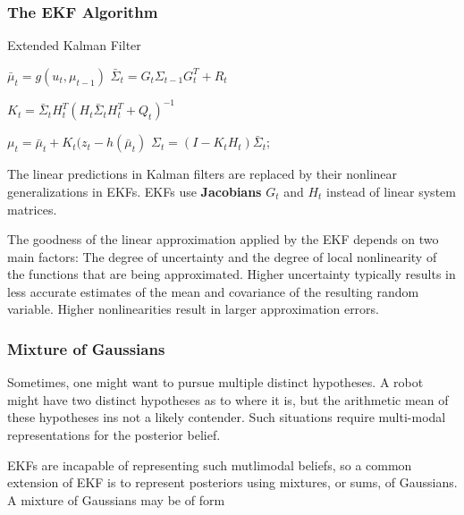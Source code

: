 \documentclass[14pt,letterpaper]{article}
\theoremstyle{definition}
\newcommand{\obs}{\bm{z}}
\newcommand{\control}{\bm{u}}
\begin{document}
\subsubsection{The EKF Algorithm}

\begin{algorithm}[H]
\caption{Extended Kalman Filter}
\KwInput{$\mu_{t-1}$, $\Sigma_{t-1}$, control $\control_t$, measurement $\obs_t$}

\BlankLine
{}
$\bar{\mu}_t = g(u_t, \mu_{t-1})$\;
$\bar{\Sigma}_t = G_t \Sigma_{t-1} G_t^T + R_t$\;

\BlankLine
{}
$K_t = \bar{\Sigma}_t H_t^T (H_t \bar{\Sigma}_t H_t^T + Q_t)^{-1}$\;

\BlankLine
{}
$\mu_t = \bar{\mu}_t + K_t (z_t -  h(\bar{\mu}_t)$\;
$\Sigma_t = (I - K_t H_t)\bar{\Sigma}_t$;\

\BlankLine
{}
\end{algorithm}

\vspace{2mm}

The linear predictions in Kalman filters are replaced by their nonlinear generalizations in EKFs.
EKFs use \textbf{Jacobians} $G_t$ and $H_t$ instead of linear system matrices.

The goodness of the linear approximation applied by the EKF depends on two main factors:
The degree of uncertainty and the degree of local nonlinearity of the functions that are being approximated.
Higher uncertainty typically results in less accurate estimates of the mean and covariance of the resulting random variable.
Higher nonlinearities result in larger approximation errors.

\subsubsection{Mixture of Gaussians}

Sometimes, one might want to pursue multiple distinct hypotheses.
A robot might have two distinct hypotheses as to where it is, but the arithmetic mean of these hypotheses ins not a likely contender.
Such situations require multi-modal representations for the posterior belief.

EKFs are incapable of representing such mutlimodal beliefs, so a common extension of EKF is to represent posteriors using mixtures, or sums, of Gaussians.
A mixture of Gaussians may be of form
\end{document}
